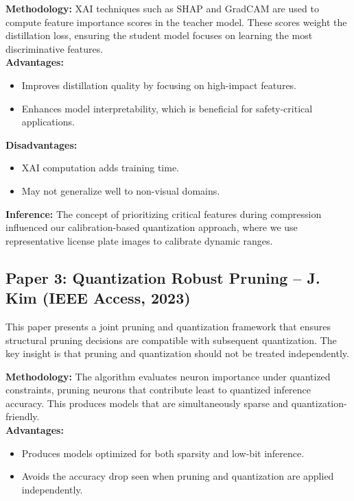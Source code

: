 \documentclass[11pt]{report}
\begin{document}
\textbf{Methodology:} XAI techniques such as SHAP and GradCAM are used to compute feature importance scores in the teacher model. These scores weight the distillation loss, ensuring the student model focuses on learning the most discriminative features. \\

\textbf{Advantages:}
\begin{itemize}
    \item Improves distillation quality by focusing on high-impact features.
    \item Enhances model interpretability, which is beneficial for safety-critical applications.
\end{itemize}

\textbf{Disadvantages:}
\begin{itemize}
    \item XAI computation adds training time.
    \item May not generalize well to non-visual domains.
\end{itemize}

\textbf{Inference:}
The concept of prioritizing critical features during compression influenced our calibration-based quantization approach, where we use representative license plate images to calibrate dynamic ranges.

\subsection{Paper 3: Quantization Robust Pruning -- J. Kim (IEEE Access, 2023)}
This paper presents a joint pruning and quantization framework that ensures structural pruning decisions are compatible with subsequent quantization. The key insight is that pruning and quantization should not be treated independently. \par

\textbf{Methodology:} The algorithm evaluates neuron importance under quantized constraints, pruning neurons that contribute least to quantized inference accuracy. This produces models that are simultaneously sparse and quantization-friendly. \\

\textbf{Advantages:}
\begin{itemize}
    \item Produces models optimized for both sparsity and low-bit inference.
    \item Avoids the accuracy drop seen when pruning and quantization are applied independently.
\end{itemize}
\end{document}
